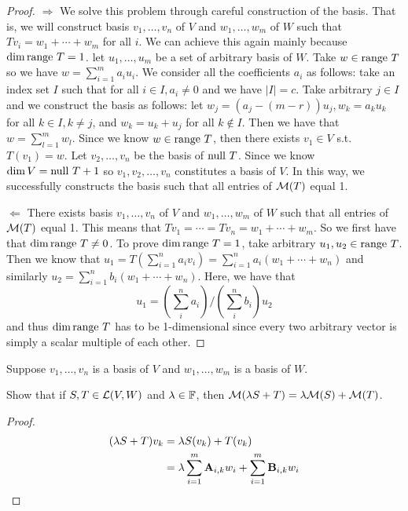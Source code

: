 \documentclass{extarticle}
\begin{document}
\begin{proof}
\(\Rightarrow\) We solve this problem through careful construction of the basis. That is, 
we will construct basis \(v_1, \ldots, v_n\) of \(V\) and \(w_1, \ldots, w_m\) of \(W\)
such that \(T v_i = w_1 + \cdots + w_m\) for all \(i\). We can achieve this again mainly 
because \(\dim \text{range } T  = 1\). let \(u_1, \ldots, u_m\) be a set of arbitrary basis of 
\(W\). Take \(w \in \text{range } T\) so we have \(w = \sum_{i=1}^{m} a_i u_i\). We consider all 
the coefficients \(a_i\) as follows: take an index set \(I\) such that for all \(i \in I, 
a_i \neq 0\) and we have \(|I| = c\). Take arbitrary \(j \in I\) and we construct the 
basis as follows: let \(w_j = (a_j - (m - r))u_j, w_k = a_k u_k \) for all \(k \in I, k \neq j\), 
and \(w_k = u_k + u_j\) for all \(k \notin I\). Then we have that \(w = \sum_{l=1}^{m}w_l\). 
Since we know \(w \in \text{range } T\), then there exists \(v_1 \in V\) s.t. \(T(v_1) = w\). Let 
\(v_2, \ldots, v_n\) be the basis of \(\text{null } T\). Since we know \(\dim V = \text{null } T + 1\) so 
\(v_1, v_2, \ldots, v_n\) constitutes a basis of \(V\). In this way, we successfully constructs
the basis such that all entries of \(\mathcal{M}(T)\) equal 1. 

\(\Leftarrow\) There exists basis \(v_1, \ldots, v_n\) of \(V\) and 
\(w_1, \ldots, w_m\) of \(W\) such that 
all entries of \(\mathcal{M}(T)\) equal 1. This means that \(T v_1 = \cdots = T v_n = w_1 + \cdots + w_m\). 
So we first have that \(\dim \text{range } T \neq 0\). To prove \(\dim \text{range } T = 1\), take arbitrary 
\(u_1, u_2 \in \text{range } T\). Then we know that \(u_1 = T(\sum_{i=1}^{n} a_i v_i) = \sum_{i=1}^{n}a_i (w_1 + \cdots + w_n)\)
and similarly \(u_2 = \sum_{i=1}^{n}b_i (w_1 + \cdots + w_n)\). Here, we have that 
\[u_1 = \left(\sum_i^n a_i \right) / \left(\sum_i^n b_i \right) u_2 \]
and thus \(\dim \text{range } T\) has to be 1-dimensional since every two arbitrary vector is simply a 
scalar multiple of each other. 
\end{proof}

\begin{problem}{3}
    Suppose \(v_1, \ldots, v_n\) is a basis of \(V\) and \(w_1, \ldots, w_m\) is a basis of \(W\). 

    Show that if \(S, T \in \mathcal{L}(V, W)\) and \(\lambda \in \mathbb{F}\), then \(\mathcal{M}(\lambda S +T)
    = \lambda \mathcal{M}(S) + \mathcal{M}(T)\). 
\end{problem}

\begin{proof}
\begin{align*}
    (\lambda S + T) v_k 
    &= \lambda S(v_k) + T(v_k) \\ 
    &= \lambda \sum_{i=1}^{m} \mathbf{A}_{i, k} w_i + \sum_{i=1}^{m} \mathbf{B}_{i, k} w_i 
\end{align*}
\end{proof}
\end{document}
